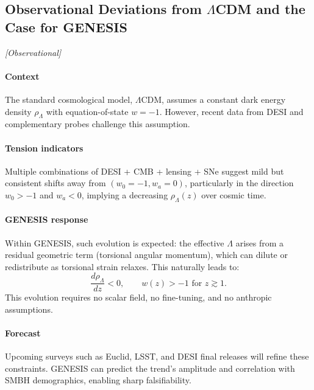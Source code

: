 \documentclass{article}
\newcommand{\obstag}{\textcolor{green!60!black}{\textit{[Observational]}}}
\begin{document}
\subsection{Observational Deviations from \texorpdfstring{$\Lambda$}{Λ}CDM and the Case for GENESIS}
\obstag
\label{sec:tension-lcdm}

\paragraph{Context}
The standard cosmological model, $\Lambda$CDM, assumes a constant dark energy density $\rho_\Lambda$ with equation-of-state $w = -1$. However, recent data from DESI and complementary probes challenge this assumption.

\paragraph{Tension indicators}
Multiple combinations of DESI + CMB + lensing + SNe suggest mild but consistent shifts away from $(w_0 = -1, w_a = 0)$, particularly in the direction $w_0 > -1$ and $w_a < 0$, implying a decreasing $\rho_\Lambda(z)$ over cosmic time.

\paragraph{GENESIS response}
Within GENESIS, such evolution is expected: the effective $\Lambda$ arises from a residual geometric term (torsional angular momentum), which can dilute or redistribute as torsional strain relaxes. This naturally leads to:
\begin{equation}\label{eq:auto115}
\frac{d\rho_\Lambda}{dz} < 0,
  \qquad
  w(z) > -1 \text{ for } z \gtrsim 1.
\end{equation}
This evolution requires no scalar field, no fine-tuning, and no anthropic assumptions.

\paragraph{Forecast}
Upcoming surveys such as Euclid, LSST, and DESI final releases will refine these constraints. GENESIS can predict the trend's amplitude and correlation with SMBH demographics, enabling sharp falsifiability.
\end{document}
